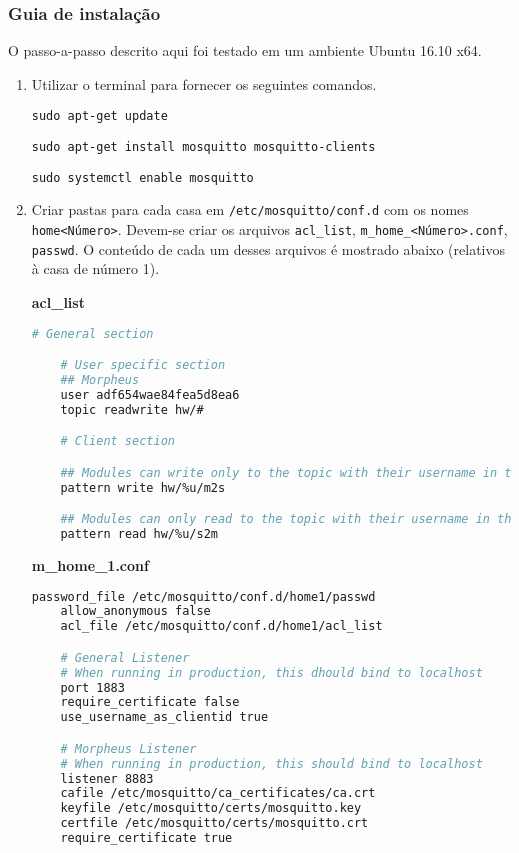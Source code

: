 \subsubsection{Guia de instalação}\label{sec:arquivosCriados}
O passo-a-passo descrito aqui foi testado em um ambiente Ubuntu 16.10 x64.

\begin{enumerate}
\item Utilizar o terminal para fornecer os seguintes comandos.

\lstinline{sudo apt-get update}

\lstinline{sudo apt-get install mosquitto mosquitto-clients}

\lstinline{sudo systemctl enable mosquitto}

\item Criar pastas para cada casa em \lstinline{/etc/mosquitto/conf.d} com os nomes \texttt{home\textless Número\textgreater}. Devem-se criar os arquivos \texttt{acl\_list}, \texttt{m\_home\_\textless Número\textgreater .conf}, \texttt{passwd}. O conteúdo de cada um desses arquivos é mostrado abaixo (relativos à casa de número 1).


\textbf{acl\_list}

\begin{lstlisting}[language=bash]
    # General section

    # User specific section
    ## Morpheus
    user adf654wae84fea5d8ea6
    topic readwrite hw/#

    # Client section

    ## Modules can write only to the topic with their username in the m2s version
    pattern write hw/%u/m2s

    ## Modules can only read to the topic with their username in the s2m version
    pattern read hw/%u/s2m
\end{lstlisting}

\textbf{m\_home\_1.conf}

\begin{lstlisting}[language=bash]
    password_file /etc/mosquitto/conf.d/home1/passwd
    allow_anonymous false
    acl_file /etc/mosquitto/conf.d/home1/acl_list

    # General Listener
    # When running in production, this dhould bind to localhost
    port 1883
    require_certificate false
    use_username_as_clientid true

    # Morpheus Listener
    # When running in production, this should bind to localhost
    listener 8883
    cafile /etc/mosquitto/ca_certificates/ca.crt
    keyfile /etc/mosquitto/certs/mosquitto.key
    certfile /etc/mosquitto/certs/mosquitto.crt
    require_certificate true
\end{lstlisting}


\end{enumerate}
